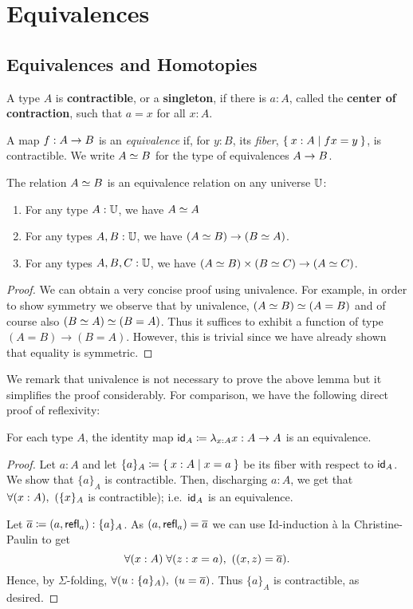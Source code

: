 \chapter{Equivalences}
\label{cha:equivalences}

\section{Equivalences and Homotopies}

\begin{defn}\label{defn:contractible}
  A type $A$ is \textbf{contractible}, or a \textbf{singleton}, if there is $a:A$, called the \textbf{center of contraction}, such that $a=x$ for all $x:A$.
\end{defn}

\begin{defn}\label{defn:equivalence}
  A map $f:A\ra B$ is an {\em equivalence} if, for $y:B$, its {\em fiber}, $\setof{x:A | fx = y}$, is contractible.
  We write $\eqv A B$ for the type of equivalences $A\ra B$.
\end{defn}

\begin{lem}\label{lem:eq-rel}
The relation $\eqv A B$ is an equivalence relation on any universe $\bbU$:
\begin{enumerate}
\item For any type $A : \bbU$, we have $\eqv A A$
\item For any types $A, B : \bbU$, we have $(\eqv A B) \to (\eqv B A)$.
\item For any types $A, B, C : \bbU$, we have $(\eqv A B) \times (\eqv B C) \to (\eqv A C)$.
\end{enumerate}
\end{lem}
\begin{proof}
We can obtain a very concise proof using univalence. For example, in order to show symmetry we observe that by univalence, $\eqv {(\eqv A B)} {(A = B)}$ and of course also $\eqv {(\eqv B A)} {(B = A)}$. Thus it suffices to exhibit a function of type $(A = B) \to (B = A)$. However, this is trivial since we have already shown that equality is symmetric.
\end{proof}
We remark that univalence is not necessary to prove the above lemma but it simplifies the proof considerably. For comparison, we have the following direct proof of reflexivity:
\begin{lem}\label{lem:id-map}
For each type $A$, the identity map $\idfunc[A]\defeq \lambda_{x:A}x :A\ra A$ is an equivalence.
\end{lem}
\begin{proof}
  Let $a:A$ and let $\{a\}_A\defeq \setof{ x:A | x=a }$ be its fiber with respect to $\idfunc[A]$.
  We show that $\{ a\}_A$ is contractible.
  Then, discharging $a:A$, we get that $\fall{x:A} (\{ x\}_A$ is contractible); i.e.\ $\idfunc[A]$ is an equivalence.

  Let $\oa \defeq (a,\refl{a}):\{ a\}_A$.  As $(a,\refl{a}) = \oa$ we can use Id-induction \`{a} la Christine-Paulin to get
  \[\fall{x:A}{z:x=a} ((x,z)=\oa).\]
  Hence, by $\Sigma$-folding, $\fall{u:\{ a\}_A} (u=\oa)$.
  Thus $\{ a\}_A$ is contractible, as desired.
\end{proof}

